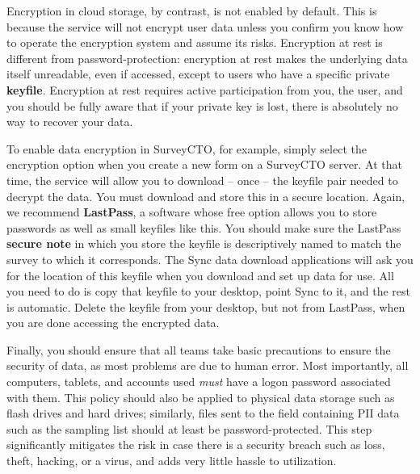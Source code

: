 Encryption in cloud storage, by contrast, is not enabled by default.
This is because the service will not encrypt user data unless you confirm
you know how to operate the encryption system and assume its risks.
Encryption at rest is different from password-protection:
encryption at rest makes the underlying data itself unreadable,
even if accessed, except to users who have a specific private \textbf{keyfile}.
Encryption at rest requires active participation from you, the user,
and you should be fully aware that if your private key is lost,
there is absolutely no way to recover your data.

To enable data encryption in SurveyCTO, for example,
simply select the encryption option
when you create a new form on a SurveyCTO server.
At that time, the service will allow you to download -- once --
the keyfile pair needed to decrypt the data.
You must download and store this in a secure location.
Again, we recommend \textbf{LastPass}, a software whose free option
allows you to store passwords as well as small keyfiles like this.
You should make sure the LastPass \textbf{secure note} in which you store the keyfile
is descriptively named to match the survey to which it corresponds.
The Sync data download applications will ask you for the location of this keyfile
when you download and set up data for use.
All you need to do is copy that keyfile to your desktop,
point Sync to it, and the rest is automatic.
Delete the keyfile from your desktop, but not from LastPass,
when you are done accessing the encrypted data.

Finally, you should ensure that all teams take basic precautions
to ensure the security of data, as most problems are due to human error.
Most importantly, all computers, tablets, and accounts used
\textit{must} have a logon password associated with them.
This policy should also be applied to physical data storage
such as flash drives and hard drives;
similarly, files sent to the field containing PII data
such as the sampling list should at least be password-protected.
This step significantly mitigates the risk in case there is
a security breach such as loss, theft, hacking, or a virus,
and adds very little hassle to utilization.


